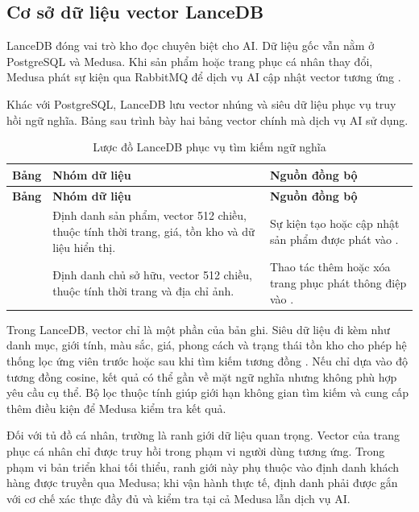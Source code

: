 \subsection{Cơ sở dữ liệu vector LanceDB}

LanceDB đóng vai trò kho đọc chuyên biệt cho AI. Dữ liệu gốc vẫn nằm ở PostgreSQL và Medusa. Khi sản phẩm hoặc trang phục cá nhân thay đổi, Medusa phát sự kiện qua RabbitMQ để dịch vụ AI cập nhật vector tương ứng \cite{lancedb,rabbitmq}.

\medskip

Khác với PostgreSQL, LanceDB lưu vector nhúng và siêu dữ liệu phục vụ truy hồi ngữ nghĩa. Bảng sau trình bày hai bảng vector chính mà dịch vụ AI sử dụng.

\begin{longtable}{L{3.1cm}L{5.1cm}L{5.4cm}}
\caption{Lược đồ LanceDB phục vụ tìm kiếm ngữ nghĩa}
\label{tab:lancedb-schema} \\
\toprule
\textbf{Bảng} & \textbf{Nhóm dữ liệu} & \textbf{Nguồn đồng bộ} \\
\midrule
\endfirsthead
\toprule
\textbf{Bảng} & \textbf{Nhóm dữ liệu} & \textbf{Nguồn đồng bộ} \\
\midrule
\endhead
{} & Định danh sản phẩm, vector 512 chiều, thuộc tính thời trang, giá, tồn kho và dữ liệu hiển thị. & Sự kiện tạo hoặc cập nhật sản phẩm được phát vào . \\
\addlinespace
{} & Định danh chủ sở hữu, vector 512 chiều, thuộc tính thời trang và địa chỉ ảnh. & Thao tác thêm hoặc xóa trang phục phát thông điệp vào . \\
\bottomrule
\end{longtable}

Trong LanceDB, vector chỉ là một phần của bản ghi. Siêu dữ liệu đi kèm như danh mục, giới tính, màu sắc, giá, phong cách và trạng thái tồn kho cho phép hệ thống lọc ứng viên trước hoặc sau khi tìm kiếm tương đồng \cite{lancedb}. Nếu chỉ dựa vào độ tương đồng cosine, kết quả có thể gần về mặt ngữ nghĩa nhưng không phù hợp yêu cầu cụ thể. Bộ lọc thuộc tính giúp giới hạn không gian tìm kiếm và cung cấp thêm điều kiện để Medusa kiểm tra kết quả.

\medskip

Đối với tủ đồ cá nhân, trường  là ranh giới dữ liệu quan trọng. Vector của trang phục cá nhân chỉ được truy hồi trong phạm vi người dùng tương ứng. Trong phạm vi bản triển khai tối thiểu, ranh giới này phụ thuộc vào định danh khách hàng được truyền qua Medusa; khi vận hành thực tế, định danh phải được gắn với cơ chế xác thực đầy đủ và kiểm tra tại cả Medusa lẫn dịch vụ AI.

